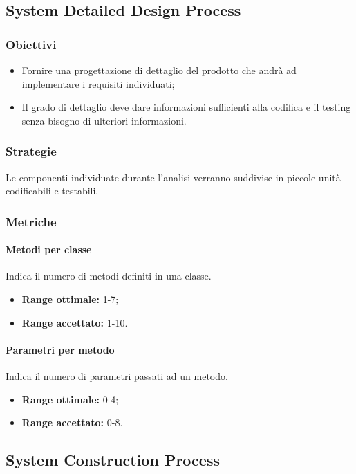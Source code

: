 \subsection{System Detailed Design Process}
		\subsubsection{Obiettivi}
		\begin{itemize}
			\item Fornire una progettazione di dettaglio del prodotto che andrà ad implementare i requisiti individuati;
			\item Il grado di dettaglio deve dare informazioni sufficienti alla codifica e il testing senza bisogno di ulteriori informazioni.
		\end{itemize}
		\subsubsection{Strategie}
		Le componenti individuate durante l'analisi verranno suddivise in piccole unità codificabili e testabili.
		\subsubsection{Metriche}
			\paragraph{Metodi per classe}
			Indica il numero di metodi definiti in una classe.
			\begin{itemize}
				\item \textbf{Range ottimale:} 1-7; 
				\item \textbf{Range accettato:} 1-10.
			\end{itemize}
			\paragraph{Parametri per metodo}
			Indica il numero di parametri passati ad un metodo.
			\begin{itemize}
				\item \textbf{Range ottimale:} 0-4;
				\item \textbf{Range accettato:} 0-8.
			\end{itemize}
			
	\subsection{System Construction Process}
